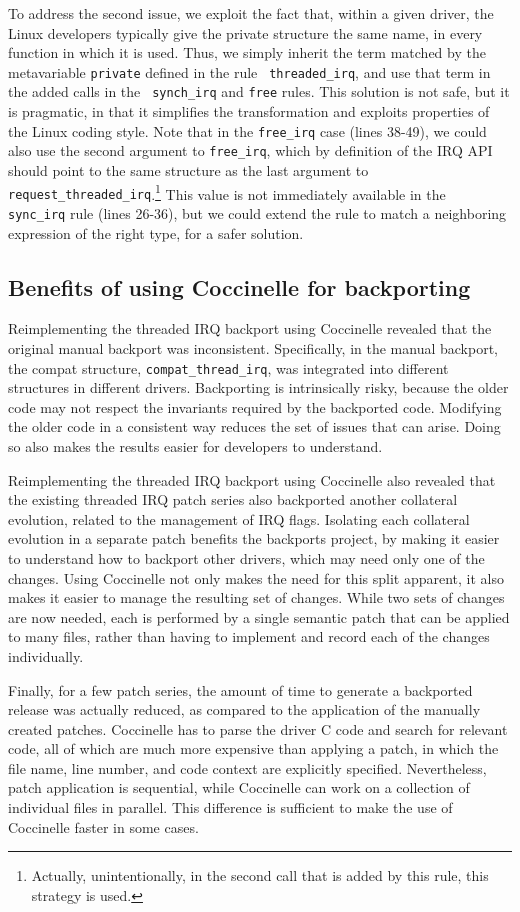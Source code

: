 To address the second issue, we exploit the fact that, within a given
driver, the Linux developers typically give the private structure the same
name, in every function in which it is used.  Thus, we simply inherit the
term matched by the metavariable {\tt private} defined in the rule {\tt
  threaded\_\-irq}, and use that term in the added calls in the {\tt
  synch\_\-irq} and {\tt free} rules.  This solution is not safe, but it is
pragmatic, in that it simplifies the transformation and exploits properties
of the Linux coding style.  Note that in the {\tt free\_\-irq} case (lines
38-49), we could also use the second argument to {\tt free\_\-irq}, which
by definition of the IRQ API should point to the same structure as the last
argument to {\tt request\_\-threa\-ded\_\-irq}.\footnote{Actually,
  unintentionally, in the second call that is added by this rule, this
  strategy is used.}  This value is not immediately available in the {\tt
  sync\_\-irq} rule (lines 26-36), but we could extend the rule to match a
neighboring expression of the right type, for a safer solution.

\subsection{Benefits of using Coccinelle for backporting}

Reimplementing the threaded IRQ backport using Coccinelle revealed that the
original manual backport was inconsistent.  Specifically, in the manual
backport, the compat structure, {\tt compat\_\-thread\_\-irq}, was integrated
into different structures in different drivers.  Backporting is
intrinsically risky, because the older code may not respect the invariants
required by the backported code.  Modifying the older code in a consistent
way reduces the set of issues that can arise.  Doing so also
makes the results easier for developers to understand.

Reimplementing the threaded IRQ backport using Coccinelle also revealed
that the existing threaded IRQ patch series also backported another
collateral evolution, related to the management of IRQ flags.  Isolating
each collateral evolution in a separate patch benefits the backports
project, by making it easier to understand how to backport other drivers,
which may need only one of the changes.  Using Coccinelle not only makes
the need for this split apparent, it also makes it easier to manage the
resulting set of changes.  While two sets of changes are now needed, each
is performed by a single semantic patch that can be applied to many files,
rather than having to implement and record each of the changes
individually.

Finally, for a few patch series, the amount of time to generate a
backported release was actually reduced, as compared to the application of
the manually created patches.  Coccinelle has to parse the driver C code
and search for relevant code, all of which are much more expensive than
applying a patch, in which the file name, line number, and code context are
explicitly specified.  Nevertheless, patch application is sequential, while
Coccinelle can work on a collection of individual files in parallel.  This
difference is sufficient to make the use of Coccinelle faster in some
cases.


